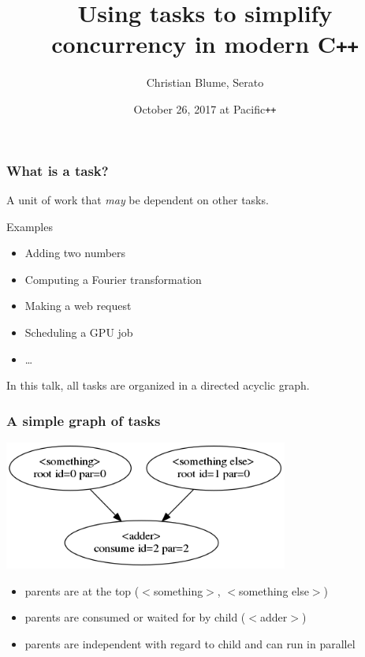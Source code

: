 \documentclass[12pt,aspectratio=169]{beamer}
\begin{document}
\title{Using tasks to simplify concurrency in modern C\texttt{++}}  
\author{Christian Blume, Serato}
\date{October 26, 2017 at Pacific\texttt{++}}

\begin{frame}
\titlepage
\end{frame}

\begin{frame}[fragile]
\frametitle{What is a task?}
A unit of work that \textit{may} be dependent on other tasks.

\bigskip
\bigskip

Examples
\begin{itemize}
\item Adding two numbers
\item Computing a Fourier transformation
\item Making a web request
\item Scheduling a GPU job
\item \ldots
\end{itemize}

\bigskip
\bigskip

In this talk, all tasks are organized in a directed acyclic graph.

\end{frame}

\begin{frame}[fragile]
\frametitle{A simple graph of tasks}
\begin{center}
\includegraphics[width=0.7\textwidth]{img/basic_with_three_tasks}
\end{center}
\begin{itemize}
\item parents are at the top ($<$something$>$, $<$something else$>$)
\item parents are consumed or waited for by child ($<$adder$>$)
\item parents are independent with regard to child and can run in parallel
\end{itemize}
\end{frame}
\end{document}
